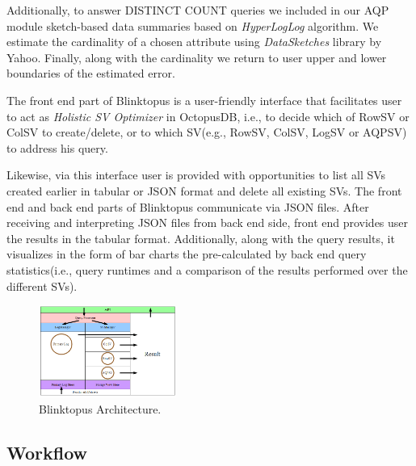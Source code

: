 \documentclass[10pt, conference, compsocconf]{IEEEtran}
\begin{document}
Additionally, to answer DISTINCT COUNT queries we included in our AQP module sketch-based data summaries based on \textit{HyperLogLog} algorithm.  We estimate the cardinality of a chosen attribute using \textit{DataSketches} library by Yahoo. Finally, along with the cardinality we return to user upper and lower boundaries of the estimated error.

The front end part of Blinktopus is a user-friendly interface that facilitates user to act as \textit{Holistic SV Optimizer} in OctopusDB, i.e., to decide which of RowSV or ColSV to create/delete, or to which SV(e.g., RowSV, ColSV, LogSV or AQPSV) to address his query. 

Likewise, via this interface user is provided with opportunities to list all SVs created earlier in tabular or JSON format and delete all existing SVs.
The front end and back end parts of Blinktopus communicate via JSON files. After receiving and interpreting JSON files from back end side, front end provides user the results in the tabular format. Additionally, along with the query results, it visualizes in the form of bar charts the pre-calculated by back end query statistics(i.e., query runtimes and a comparison of the results performed over the different SVs).

\begin{figure} \includegraphics[width=0.4\textwidth, center]{img/blinktopus_architecture.png} 
\caption{Blinktopus Architecture.}
\end{figure}

\subsection{Workflow}
\end{document}
